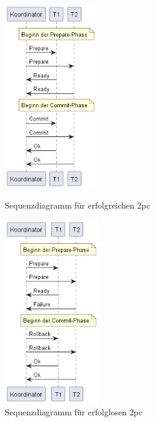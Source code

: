 \begin{figure}[!htbp]
	\begin{minipage}{.45\textwidth}
		\centering
		\includegraphics[height=8cm]{figures/ChapterGrundlagen/2pcSuccess-0.png}
		\caption{Sequenzdiagramm für erfolgreichen \acrshort{2pc}}
		\label{fig:2pcsucces}
	\end{minipage}
	\hfill
	\hfill
	\begin{minipage}{.45\textwidth}
		\centering
		\includegraphics[height=8cm]{figures/ChapterGrundlagen/2pcFailure-0.png}
		\caption{Sequenzdiagramm für erfolglosen \acrshort{2pc}}
		\label{fig:2pcfailure}
	\end{minipage}
\end{figure}
\FloatBarrier

